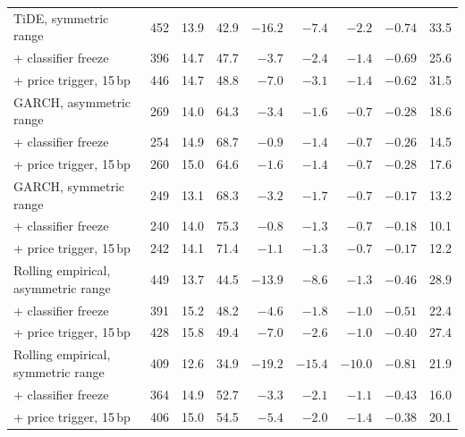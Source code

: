 \begin{table}[pos=!htbp,align=\centering]
{\begin{tabular}{lrrrrrrrr}
TiDE, symmetric range & 452 & 13.9 & 42.9 & $-16.2$ & $-7.4$ & $-2.2$ & $-0.74$ & 33.5 \\
\quad + classifier freeze & 396 & 14.7 & 47.7 & $-3.7$ & $-2.4$ & $-1.4$ & $-0.69$ & 25.6 \\
\quad + price trigger, 15\,bp & 446 & 14.7 & 48.8 & $-7.0$ & $-3.1$ & $-1.4$ & $-0.62$ & 31.5 \\
\midrule
GARCH, asymmetric range & 269 & 14.0 & 64.3 & $-3.4$ & $-1.6$ & $-0.7$ & $-0.28$ & 18.6 \\
\quad + classifier freeze & 254 & 14.9 & 68.7 & $-0.9$ & $-1.4$ & $-0.7$ & $-0.26$ & 14.5 \\
\quad + price trigger, 15\,bp & 260 & 15.0 & 64.6 & $-1.6$ & $-1.4$ & $-0.7$ & $-0.28$ & 17.6 \\
GARCH, symmetric range & 249 & 13.1 & 68.3 & $-3.2$ & $-1.7$ & $-0.7$ & $-0.17$ & 13.2 \\
\quad + classifier freeze & 240 & 14.0 & 75.3 & $-0.8$ & $-1.3$ & $-0.7$ & $-0.18$ & 10.1 \\
\quad + price trigger, 15\,bp & 242 & 14.1 & 71.4 & $-1.1$ & $-1.3$ & $-0.7$ & $-0.17$ & 12.2 \\
\midrule
Rolling empirical, asymmetric range & 449 & 13.7 & 44.5 & $-13.9$ & $-8.6$ & $-1.3$ & $-0.46$ & 28.9 \\
\quad + classifier freeze & 391 & 15.2 & 48.2 & $-4.6$ & $-1.8$ & $-1.0$ & $-0.51$ & 22.4 \\
\quad + price trigger, 15\,bp & 428 & 15.8 & 49.4 & $-7.0$ & $-2.6$ & $-1.0$ & $-0.40$ & 27.4 \\
Rolling empirical, symmetric range & 409 & 12.6 & 34.9 & $-19.2$ & $-15.4$ & $-10.0$ & $-0.81$ & 21.9 \\
\quad + classifier freeze & 364 & 14.9 & 52.7 & $-3.3$ & $-2.1$ & $-1.1$ & $-0.43$ & 16.0 \\
\quad + price trigger, 15\,bp & 406 & 15.0 & 54.5 & $-5.4$ & $-2.0$ & $-1.4$ & $-0.38$ & 20.1 \\
\bottomrule
\end{tabular}}
\end{table}
